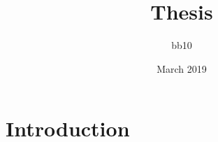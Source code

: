 \documentclass{article}
\title{Thesis}
\author{bb10 }
\date{March 2019}
\begin{document}
\maketitle

\section{Introduction}
\end{document}
